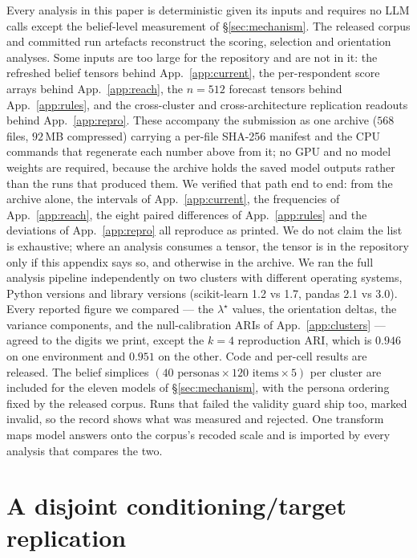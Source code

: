 \documentclass[11pt]{article}
\begin{document}
Every analysis in this paper is deterministic given its inputs and requires no
LLM calls except the belief-level measurement of \S\ref{sec:mechanism}. The
released corpus and committed run artefacts reconstruct the scoring, selection
and orientation analyses. Some inputs are too large for the repository and are not in it: the refreshed
belief tensors behind App.~\ref{app:current}, the per-respondent score arrays
behind App.~\ref{app:reach}, the $n{=}512$ forecast tensors behind
App.~\ref{app:rules}, and the cross-cluster and cross-architecture replication
readouts behind App.~\ref{app:repro}. These accompany the submission as one
archive ($568$ files, $92$\,MB compressed) carrying a per-file SHA-256 manifest
and the CPU commands that regenerate each number above from it; no GPU and no
model weights are required, because the archive holds the saved model outputs
rather than the runs that produced them. We verified that path end to end: from
the archive alone, the intervals of App.~\ref{app:current}, the frequencies of
App.~\ref{app:reach}, the eight paired differences of App.~\ref{app:rules} and
the deviations of App.~\ref{app:repro} all reproduce as printed. We do not claim
the list is exhaustive; where an analysis consumes a tensor, the tensor is in
the repository only if this appendix says so, and otherwise in the archive. We ran the full analysis pipeline
independently on two clusters with different operating systems, Python versions
and library versions (scikit-learn 1.2 vs 1.7, pandas 2.1 vs 3.0). Every reported
figure we compared --- the $\lambda^\star$ values, the orientation deltas, the
variance components, and the null-calibration ARIs of App.~\ref{app:clusters} ---
agreed to the digits we print, except the $k{=}4$ reproduction ARI, which is
$0.946$ on one environment and $0.951$ on the other. Code and per-cell results are released. The belief simplices
$(40\text{ personas}\times120\text{ items}\times5)$ per cluster are included for
the eleven models of \S\ref{sec:mechanism}, with the persona ordering fixed by
the released corpus. Runs that failed
the validity guard ship too, marked invalid, so the record shows what was
measured and rejected. One transform maps model answers onto the corpus's
recoded scale and is imported by every analysis that compares the two.

\section{A disjoint conditioning/target replication}
\label{app:disjoint}
\end{document}
